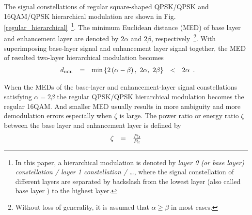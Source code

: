 \documentclass[conference]{IEEEtran}
\begin{document}
The signal constellations of regular square-shaped QPSK/QPSK and
16QAM/QPSK hierarchical modulation are shown in Fig.
\ref{regular_hierarchical}~\footnote{In this paper, a hierarchical
modulation is denoted by {\em layer 0 (or base layer)
constellation / layer 1 constellation / \ldots}, where the signal
constellation of different layers are separated by backslash from
the lowest layer (also called base layer ) to the highest layer.
}. The minimum Euclidean distance (MED) of base layer and
enhancement layer are denoted by $2\alpha$ and $2\beta$,
respectively~\footnote{Without loss of generality, it is assumed
that $\alpha\geq\beta$ in most cases.}. With superimposing
base-layer signal and enhancement layer signal together, the MED
of resulted two-layer hierarchical modulation becomes
\begin{equation}
\begin{array}{rcccl}
d_{\rm min}& = & \min\left\{2\left(\alpha-\beta\right),\ 2\alpha,\
2\beta\right\}&<& 2\alpha
\end{array}.\label{Regular_MED}
\end{equation}
\begin{figure}
\end{figure}
\noindent When the MEDs of the base-layer and enhancement-layer
signal constellations satisfying $\alpha=2\beta$ the regular
QPSK/QPSK hierarchical modulation becomes the regular 16QAM. And
smaller MED usually results in more ambiguity and more
demodulation errors especially when $\zeta$ is large. The power
ratio or energy ratio $\zeta$ between the base layer and
enhancement layer is defined by
\begin{equation}
\begin{array}{rcl}
\zeta & = & \frac{P_{\mbox{\tiny B}}}{P_{\mbox{\tiny E}}}
\end{array}\label{power_ratio}
\end{equation}
\end{document}
